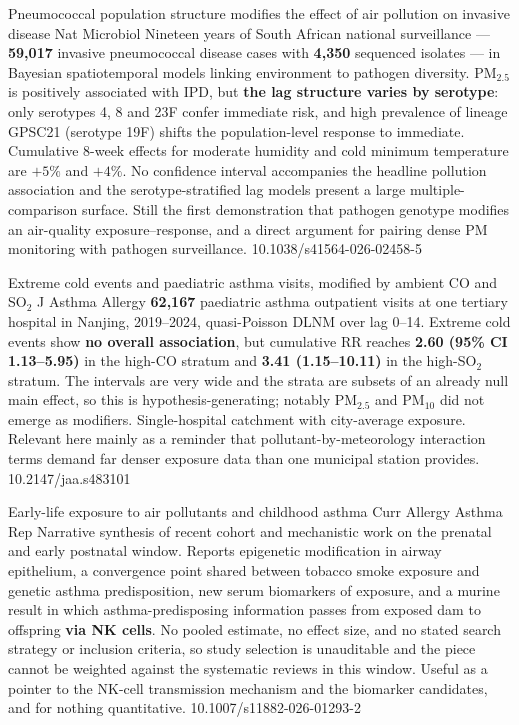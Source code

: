 \documentclass[10pt]{article}
\begin{document}
\clearpage


{Pneumococcal population structure modifies the effect of air pollution on invasive disease}
{Nat Microbiol}
{Nineteen years of South African national surveillance --- \textbf{59{,}017} invasive
pneumococcal disease cases with \textbf{4{,}350} sequenced isolates --- in Bayesian
spatiotemporal models linking environment to pathogen diversity. PM$_{2.5}$ is positively
associated with IPD, but \textbf{the lag structure varies by serotype}: only serotypes 4,
8 and 23F confer immediate risk, and high prevalence of lineage GPSC21 (serotype 19F)
shifts the population-level response to immediate. Cumulative 8-week effects for moderate
humidity and cold minimum temperature are $+5\%$ and $+4\%$. No confidence interval
accompanies the headline pollution association and the serotype-stratified lag models
present a large multiple-comparison surface. Still the first demonstration that pathogen
genotype modifies an air-quality exposure--response, and a direct argument for pairing
dense PM monitoring with pathogen surveillance.}
{10.1038/s41564-026-02458-5}

{Extreme cold events and paediatric asthma visits, modified by ambient CO and SO$_2$}
{J Asthma Allergy}
{\textbf{62{,}167} paediatric asthma outpatient visits at one tertiary hospital in Nanjing,
2019--2024, quasi-Poisson DLNM over lag 0--14. Extreme cold events show \textbf{no overall
association}, but cumulative RR reaches \textbf{2.60 (95\% CI 1.13--5.95)} in the high-CO
stratum and \textbf{3.41 (1.15--10.11)} in the high-SO$_2$ stratum. The intervals are very
wide and the strata are subsets of an already null main effect, so this is
hypothesis-generating; notably PM$_{2.5}$ and PM$_{10}$ did not emerge as modifiers.
Single-hospital catchment with city-average exposure. Relevant here mainly as a reminder
that pollutant-by-meteorology interaction terms demand far denser exposure data than one
municipal station provides.}
{10.2147/jaa.s483101}

{Early-life exposure to air pollutants and childhood asthma}
{Curr Allergy Asthma Rep}
{Narrative synthesis of recent cohort and mechanistic work on the prenatal and early
postnatal window. Reports epigenetic modification in airway epithelium, a convergence
point shared between tobacco smoke exposure and genetic asthma predisposition, new serum
biomarkers of exposure, and a murine result in which asthma-predisposing information
passes from exposed dam to offspring \textbf{via NK cells}. No pooled estimate, no effect
size, and no stated search strategy or inclusion criteria, so study selection is
unauditable and the piece cannot be weighted against the systematic reviews in this
window. Useful as a pointer to the NK-cell transmission mechanism and the biomarker
candidates, and for nothing quantitative.}
{10.1007/s11882-026-01293-2}
\end{document}
